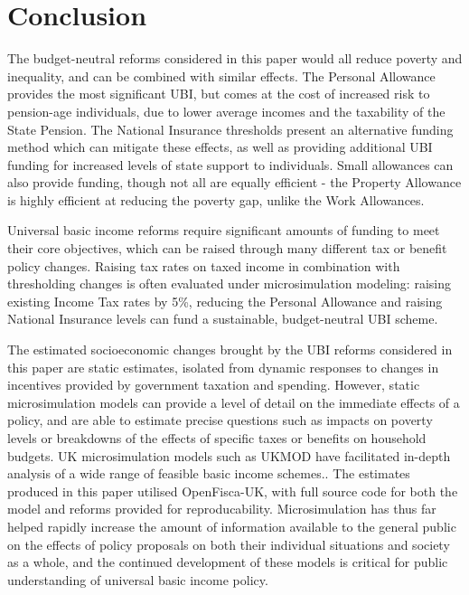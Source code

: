 \documentclass{article}
\begin{document}
    \section{Conclusion}
    The budget-neutral reforms considered in this paper would all reduce poverty and inequality, and can be combined with similar effects. The Personal Allowance provides the most significant UBI, but comes at the cost of increased risk to pension-age individuals, due to lower average incomes and the taxability of the State Pension. The National Insurance thresholds present an alternative funding method which can mitigate these effects, as well as providing additional UBI funding for increased levels of state support to individuals. Small allowances can also provide funding, though not all are equally efficient - the Property Allowance is highly efficient at reducing the poverty gap, unlike the Work Allowances.

    Universal basic income reforms require significant amounts of funding to meet their core objectives, which can be raised through many different tax or benefit policy changes. Raising tax rates on taxed income in combination with thresholding changes is often evaluated under microsimulation modeling: raising existing Income Tax rates by 5\%, reducing the Personal Allowance and raising National Insurance levels can fund a sustainable, budget-neutral UBI scheme\cite{recovery_UBI}.

    The estimated socioeconomic changes brought by the UBI reforms considered in this paper are static estimates, isolated from dynamic responses to changes in incentives provided by government taxation and spending. However, static microsimulation models can provide a level of detail on the immediate effects of a policy, and are able to estimate precise questions such as impacts on poverty levels or breakdowns of the effects of specific taxes or benefits on household budgets. UK microsimulation models such as UKMOD have facilitated in-depth analysis of a wide range of feasible basic income schemes.\cite{feasible_UBI_2}\cite{feasible_UBI_1}. The estimates produced in this paper utilised OpenFisca-UK, with full source code for both the model and reforms provided for reproducability. Microsimulation has thus far helped rapidly increase the amount of information available to the general public on the effects of policy proposals on both their individual situations and society as a whole, and the continued development of these models is critical for public understanding of universal basic income policy.
    
    
\end{document}

